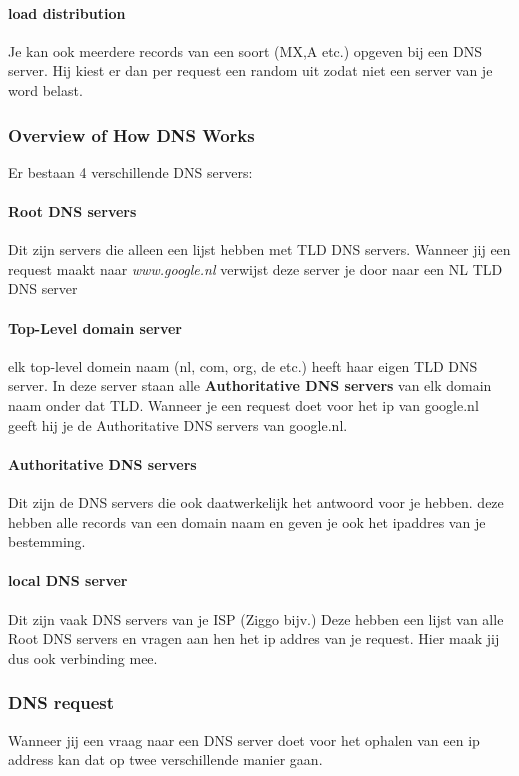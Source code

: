 \paragraph{load distribution}
Je kan ook meerdere records van een soort (MX,A etc.) opgeven bij een DNS server. Hij kiest er dan per request een random uit zodat niet een server van je word belast.

\subsubsection{Overview of How DNS Works}
Er bestaan 4 verschillende DNS servers:
\paragraph{Root DNS servers}
Dit zijn servers die alleen een lijst hebben met TLD DNS servers. Wanneer jij een request maakt naar \textit{www.google.nl} verwijst deze server je door naar een NL TLD DNS server
\paragraph{Top-Level domain server}
elk top-level domein naam (nl, com, org, de etc.) heeft haar eigen TLD DNS server. In deze server staan alle \textbf{Authoritative DNS servers} van elk domain naam onder dat TLD. Wanneer je een request doet voor het ip van google.nl geeft hij je de Authoritative DNS servers van google.nl.
\paragraph{Authoritative DNS servers}
Dit zijn de DNS servers die ook daatwerkelijk het antwoord voor je hebben. deze hebben alle records van een domain naam en geven je ook het ipaddres van je bestemming.
\paragraph{local DNS server}
Dit zijn vaak DNS servers van je ISP (Ziggo bijv.) Deze hebben een lijst van alle Root DNS servers en vragen aan hen het ip addres van je request. Hier maak jij dus ook verbinding mee.
\newline
\subsubsection*{DNS request}
Wanneer jij een vraag naar een DNS server doet voor het ophalen van een ip address kan dat op twee verschillende manier gaan.
